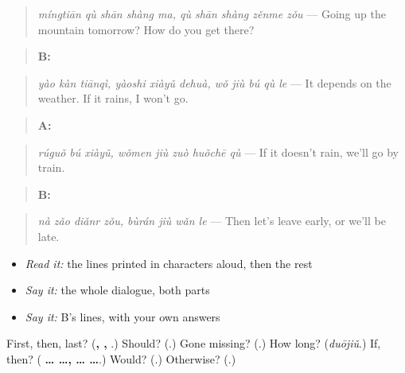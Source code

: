 \begin{quote}
\emph{míngtiān qù shān shàng ma, qù shān shàng zěnme zǒu} — Going up the mountain tomorrow? How do you get there?
\end{quote}

\begin{quote}
\textbf{B:}   
\end{quote}

\begin{quote}
\emph{yào kàn tiānqì, yàoshi xiàyǔ dehuà, wǒ jiù bú qù le} — It depends on the weather. If it rains, I won't go.
\end{quote}

\begin{quote}
\textbf{A:}  
\end{quote}

\begin{quote}
\emph{rúguǒ bú xiàyǔ, wǒmen jiù zuò huǒchē qù} — If it doesn't rain, we'll go by train.
\end{quote}

\begin{quote}
\textbf{B:}  
\end{quote}

\begin{quote}
\emph{nà zǎo diǎnr zǒu, bùrán jiù wǎn le} — Then let's leave early, or we'll be late.
\end{quote}

\begin{itemize}
\raggedright
  \item \emph{Read it:} the lines printed in characters aloud, then the rest
  \item \emph{Say it:} the whole dialogue, both parts
  \item \emph{Say it:} B's lines, with your own answers
\end{itemize}

\begin{tcolorbox}[breakable,colback=teal!4,colframe=teal!35!black,title={Before you move on}]
First, then, last? (\textbf{, , }.) Should? (\textbf{}.) Gone missing? (\textbf{}.) How long? (\emph{duōjiǔ}.) If, then? (\textbf{ …  …,  …  …}.) Would? (\textbf{}.) Otherwise? (\textbf{}.)
\end{tcolorbox}
